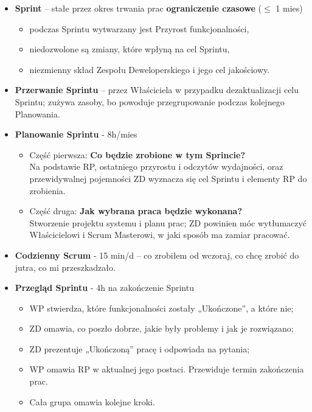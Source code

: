 \documentclass[main.tex]{subfiles}
\begin{document}
    \begin{itemize}
        \item \textbf{Sprint} -- stałe przez okres trwania prac \textbf{ograniczenie czasowe} ($\leq$ 1 mies)
        \begin{itemize}[noitemsep]
            \item podczas Sprintu wytwarzany jest Przyrost funkcjonalności,
            \item niedozwolone są zmiany, które wpłyną na cel Sprintu,
            \item niezmienny skład Zespołu Deweloperskiego i jego cel jakościowy.
        \end{itemize}

        \item \textbf{Przerwanie Sprintu} -- przez Właściciela w przypadku dezaktualizacji celu Sprintu;
        zużywa zasoby, bo powoduje przegrupowanie podczas kolejnego Planowania.

        \item \textbf{Planowanie Sprintu} - 8h/mies
        \begin{itemize}[noitemsep]
            \item Część pierwsza: \textbf{Co będzie zrobione w tym Sprincie?}\\
            Na podstawie RP, ostatniego przyrostu i odczytów wydajności, oraz przewidywalnej pojemności ZD wyznacza się
            cel Sprintu i elementy RP do zrobienia.
            \item Część druga: \textbf{Jak wybrana praca będzie wykonana?}\\
            Stworzenie projektu systemu i planu prac; ZD powinien móc wytłumaczyć Właścicielowi i Scrum Masterowi,
            w jaki sposób ma zamiar pracować.
        \end{itemize}

        \item \textbf{Codzienny Scrum} - 15 min/d -- co zrobiłem od wczoraj, co chcę zrobić do jutra, co mi przeszkadzało.

        \item \textbf{Przegląd Sprintu} - 4h na zakończenie Sprintu
        \begin{itemize}[noitemsep]
            \item WP stwierdza, które funkcjonalności zostały „Ukończone”, a które nie;
            \item ZD omawia, co poszło dobrze, jakie były problemy i jak je rozwiązano;
            \item ZD prezentuje „Ukończoną” pracę i odpowiada na pytania;
            \item WP omawia RP w aktualnej jego postaci. Przewiduje termin zakończenia prac.
            \item Cała grupa omawia kolejne kroki.
        \end{itemize}


\end{itemize}
\end{document}
